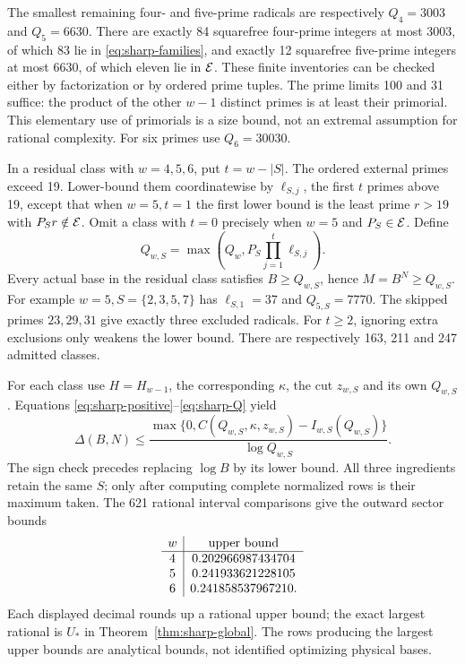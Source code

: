 \documentclass[11pt]{article}
\theoremstyle{definition}\newtheorem{definition}[theorem]{Definition}
\theoremstyle{remark}\newtheorem{remark}[theorem]{Remark}
\begin{document}
The smallest remaining four- and five-prime radicals are respectively
\(Q_4=3003\) and \(Q_5=6630\).
There are exactly 84 squarefree four-prime integers at most 3003,
of which 83 lie in \eqref{eq:sharp-families}, and exactly 12 squarefree
five-prime integers at most 6630, of which eleven lie in \({\cal E}\).
These finite inventories can be checked either by factorization or by
ordered prime tuples. The prime limits 100 and 31 suffice: the product
of the other \(w-1\) distinct primes is at least their primorial.
This elementary use of primorials is a size bound, not an extremal
assumption for rational complexity. For six primes use \(Q_6=30030\).

In a residual class with \(w=4,5,6\), put \(t=w-|S|\).
The ordered external primes exceed 19. Lower-bound them coordinatewise
by \(\ell_{S,j}\), the first \(t\) primes above 19, except that when
\(w=5,t=1\) the first lower bound is the least prime \(r>19\) with
\(P_Sr\notin{\cal E}\). Omit a class with \(t=0\) precisely when
\(w=5\) and \(P_S\in{\cal E}\). Define
\[
 Q_{w,S}=\max\left(Q_w,P_S\prod_{j=1}^t\ell_{S,j}\right).               \tag{S11}\label{eq:sharp-Q}
\]
Every actual base in the residual class satisfies
\(B\ge Q_{w,S}\), hence \(M=B^N\ge Q_{w,S}\).
For example \(w=5,S=\{2,3,5,7\}\) has \(\ell_{S,1}=37\) and
\(Q_{5,S}=7770\). The skipped primes \(23,29,31\) give exactly three
excluded radicals. For \(t\ge2\), ignoring extra exclusions only weakens
the lower bound. There are respectively 163, 211 and 247 admitted classes.

For each class use \(H=H_{w-1}\), the corresponding \(\kappa\), the cut
\(z_{w,S}\) and its own \(Q_{w,S}\). Equations
\eqref{eq:sharp-positive}--\eqref{eq:sharp-Q} yield
\[
 \Delta(B,N)\le
 \frac{\max\{0,C(Q_{w,S},\kappa,z_{w,S})-I_{w,S}(Q_{w,S})\}}
 {\log Q_{w,S}}.                                                     \tag{S12}\label{eq:sharp-row}
\]
The sign check precedes replacing \(\log B\) by its lower bound.
All three ingredients retain the same \(S\); only after computing
complete normalized rows is their maximum taken.
The 621 rational interval comparisons give the outward sector bounds
\[
\begin{array}{c|c}
 w&\hbox{upper bound}\\ \hline
 4&0.202966987434704\\
 5&0.241933621228105\\
 6&0.241858537967210 .
\end{array}
\]
Each displayed decimal rounds up a rational upper bound; the exact
largest rational is \(U_*\) in Theorem~\ref{thm:sharp-global}.
The rows producing the largest upper bounds are analytical bounds,
not identified optimizing physical bases.
\end{document}
